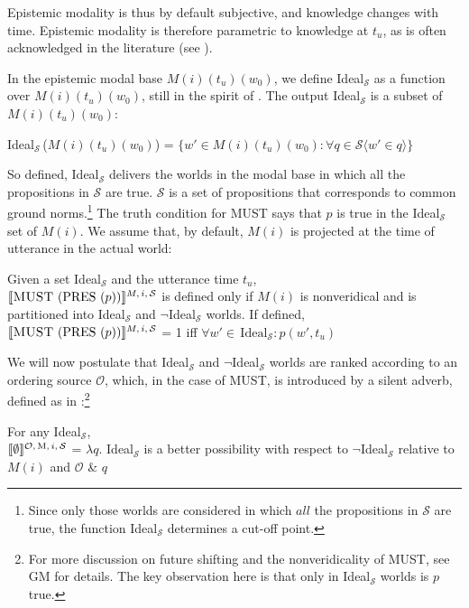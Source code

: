 \documentclass[output=paper,colorlinks,citecolor=brown]{langscibook}
\begin{document}
Epistemic modality is thus  by default subjective,  and knowledge changes with time. Epistemic modality is therefore parametric to knowledge at $t_u$, as is often  acknowledged  in the literature (see \citealt{portner2009, hacquard2006, hacquard2010, giannakidoumari2016}).  
 
 In the epistemic modal base $M(i)(t_u)(w_0)$, we define Ideal$_{\mathcal{S}}$ as a function over $M(i)(t_u)(w_0)$, still in the spirit of \citet{portner2009}. The output Ideal$_{\mathcal{S}}$  is a subset of $M(i)(t_u)(w_0)$: 

\ea Ideal$_{\mathcal{S}}\,$($M(i)(t_u)(w_0)$) = $\{ w' \in M(i)(t_u)(w_0) : \forall q \in \mathcal{S} \langle w' \in q \rangle \}$
\z

So defined, Ideal$_{\mathcal{S}}$ delivers the worlds in the modal base in which all the propositions in $\mathcal{S}$ are true. $\mathcal{S}$ is a set of propositions that corresponds to common ground norms.\footnote{Since only those worlds are considered in which $all$ the propositions in $\mathcal{S}$ are true, the function Ideal$_{\mathcal{S}}$ determines a cut-off point.} The truth condition for \textsc{MUST} says that $p$ is true in the Ideal$_{\mathcal{S}}$ set of $M(i)$. We assume that, by default, $M(i)$ is projected at the time of utterance in the actual world: 
 
\ea Given a set Ideal$_{\mathcal{S}}$ and the utterance time $t_u$, \\
$\llbracket\text{\textsc{MUST} (PRES (}p\text{))}\rrbracket\textsuperscript{\ensuremath{M,i,\mathcal{S}}}$ is defined only if $M(i)$ is nonveridical and  is partitioned into Ideal$_{\mathcal{S}}$ and $\neg$Ideal$_{\mathcal{S}}$ worlds. If defined,\\ 
$\llbracket\text{\textsc{MUST} (PRES (}p\text{))}\rrbracket\textsuperscript{\ensuremath{M,i,\mathcal{S}}}$ = 1  iff  $\forall w' \in \, \text{Ideal}_{\mathcal{S}}:   p(w',t_u)$
\z

We will now postulate that Ideal$_{\mathcal{S}}$ and $\neg$Ideal$_{\mathcal{S}}$ worlds are ranked according to an ordering source $\mathcal{O}$, which, in the case of \textsc{MUST}, is introduced by a silent adverb, defined as in :\footnote{For more discussion on future shifting and the nonveridicality of \textsc{MUST}, see GM for details. The key observation here is that only in Ideal$_{\mathcal{S}}$ worlds is $p$ true.}


\ea  \label{highconf} For any Ideal$_{\mathcal{S}}$,\\ $\llbracket\emptyset\rrbracket\textsuperscript{\ensuremath{\mathcal{O},\text{M},i,\mathcal{S}}}$ = $\lambda q$.  Ideal$_{\mathcal{S}}$ is a better possibility with respect to $\neg$Ideal$_{\mathcal{S}}$ relative to $M(i)$  and $\mathcal{O}$ \& $q$ 
\z
\end{document}
